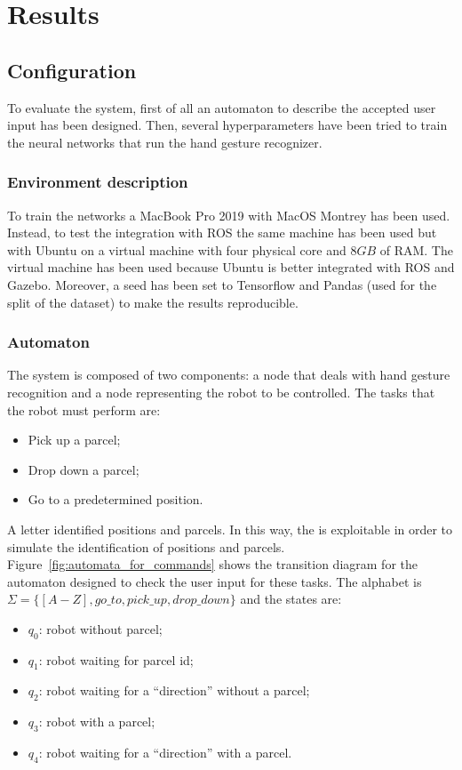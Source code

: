 \documentclass[../thesis.tex]{subfiles}
\begin{document}
\chapter{Results}\label{cap:results}
\section{Configuration}
To evaluate the system, first of all an automaton to describe the accepted user input has been designed. Then, several hyperparameters have been tried to train the neural networks that run the hand gesture recognizer.

\subsection{Environment description}
To train the networks a MacBook Pro 2019 with MacOS Montrey has been used. Instead, to test the integration with ROS the same machine has been used but with Ubuntu on a virtual machine with four physical core and $8GB$ of RAM. The virtual machine has been used because Ubuntu is better integrated with \acrshort{ROS} and Gazebo. Moreover, a seed has been set to Tensorflow and Pandas (used for the split of the dataset) to make the results reproducible.

\subsection{Automaton}
The system is composed of two components: a node that deals with  hand gesture recognition and a node representing the robot to be controlled. The tasks that the robot must perform are:
\begin{itemize}
    \item Pick up a parcel;
    \item Drop down a parcel;
    \item Go to a predetermined position.
\end{itemize}
A letter identified positions and parcels. In this way, the  is exploitable in order to simulate the identification of positions and parcels.\\
Figure~\ref{fig:automata_for_commands} shows the transition diagram for the automaton designed to check the user input for these tasks. The alphabet is $\Sigma = \{[A-Z], go\_to, pick\_up, drop\_down\}$ and the states are:
\begin{itemize}
    \item \textbf{$q_0$}: robot without parcel; 
    \item \textbf{$q_1$}: robot waiting for parcel id; 
    \item \textbf{$q_2$}: robot waiting for a ``direction'' without a parcel;
    \item \textbf{$q_3$}: robot with a parcel;
    \item \textbf{$q_4$}: robot waiting for a ``direction'' with a parcel.
\end{itemize}
\end{document}
